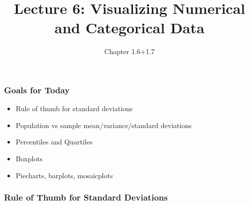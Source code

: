 \documentclass[handout]{beamer}
\title{Lecture 6: Visualizing Numerical and Categorical Data}
\author{Chapter 1.6+1.7}
\date{}
\newcommand{\blue}[1]{\textcolor{blue2}{#1}}
\begin{document}
\begin{frame}
\titlepage
\end{frame}


\begin{frame}[fragile]
\frametitle{Goals for Today}

\begin{itemize}
\item Rule of thumb for standard deviations
\item Population vs sample mean/variance/standard deviations
\item Percentiles and Quartiles
\item Boxplots
\item Piecharts, barplots, mosaicplots
\end{itemize}

\end{frame}


\begin{frame}[fragile]
\frametitle{Rule of Thumb for Standard Deviations}

%
%

\end{frame}
\end{document}
